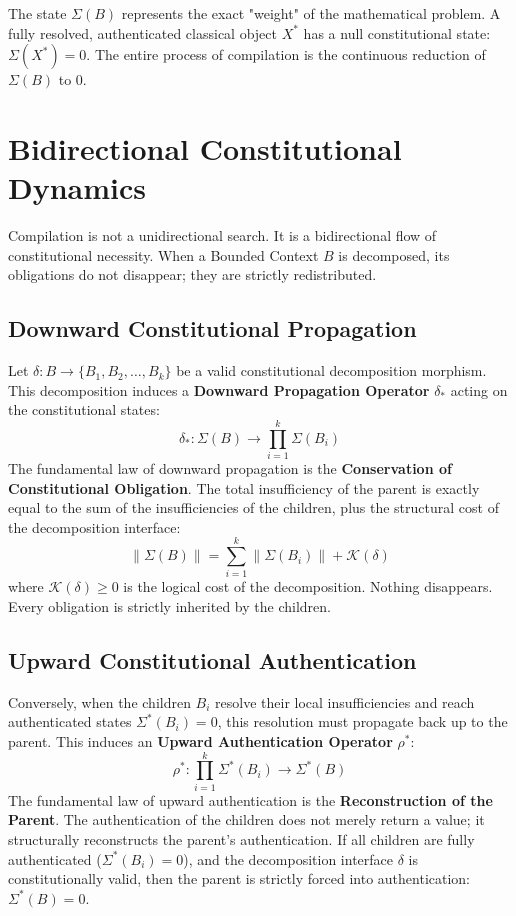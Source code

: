 \documentclass[12pt,openany]{extbook}
\theoremstyle{plain}
\theoremstyle{definition}
\begin{document}
The state $\Sigma(B)$ represents the exact "weight" of the mathematical problem. A fully resolved, authenticated classical object $X^*$ has a null constitutional state: $\Sigma(X^*) = 0$. The entire process of compilation is the continuous reduction of $\Sigma(B)$ to $0$.

\section{Bidirectional Constitutional Dynamics}

Compilation is not a unidirectional search. It is a bidirectional flow of constitutional necessity. When a Bounded Context $B$ is decomposed, its obligations do not disappear; they are strictly redistributed.

\subsection{Downward Constitutional Propagation}
Let $\delta: B \to \{B_1, B_2, \dots, B_k\}$ be a valid constitutional decomposition morphism. This decomposition induces a \textbf{Downward Propagation Operator} $\delta_*$ acting on the constitutional states:
\[
\delta_* : \Sigma(B) \longrightarrow \prod_{i=1}^k \Sigma(B_i)
\]
The fundamental law of downward propagation is the \textbf{Conservation of Constitutional Obligation}. The total insufficiency of the parent is exactly equal to the sum of the insufficiencies of the children, plus the structural cost of the decomposition interface:
\[
\|\Sigma(B)\| = \sum_{i=1}^k \|\Sigma(B_i)\| + \mathcal{K}(\delta)
\]
where $\mathcal{K}(\delta) \geq 0$ is the logical cost of the decomposition. Nothing disappears. Every obligation is strictly inherited by the children.

\subsection{Upward Constitutional Authentication}
Conversely, when the children $B_i$ resolve their local insufficiencies and reach authenticated states $\Sigma^*(B_i) = 0$, this resolution must propagate back up to the parent. This induces an \textbf{Upward Authentication Operator} $\rho^*$:
\[
\rho^* : \prod_{i=1}^k \Sigma^*(B_i) \longrightarrow \Sigma^*(B)
\]
The fundamental law of upward authentication is the \textbf{Reconstruction of the Parent}. The authentication of the children does not merely return a value; it structurally reconstructs the parent's authentication. If all children are fully authenticated ($\Sigma^*(B_i) = 0$), and the decomposition interface $\delta$ is constitutionally valid, then the parent is strictly forced into authentication: $\Sigma^*(B) = 0$.
\end{document}
